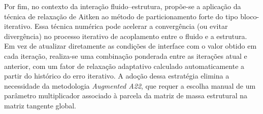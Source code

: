 Por fim, no contexto da interação fluido--estrutura, propõe-se a aplicação da técnica de relaxação de Aitken ao método de particionamento forte do tipo bloco-iterativo. Essa técnica numérica pode acelerar a convergência (ou evitar divergência) no processo iterativo de acoplamento entre o fluido e a estrutura.  
Em vez de atualizar diretamente as condições de interface com o valor obtido em cada iteração, realiza-se uma combinação ponderada entre as iterações atual e anterior, com um fator de relaxação adaptativo calculado automaticamente a partir do histórico do erro iterativo.  
A adoção dessa estratégia elimina a necessidade da metodologia \textit{Augmented A22}, que requer a escolha manual de um parâmetro multiplicador associado à parcela da matriz de massa estrutural na matriz tangente global.
